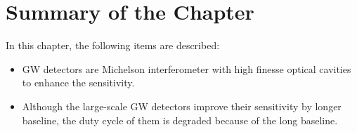 \section{Summary of the Chapter}
In this chapter, the following items are described:
\begin{itemize}
\item GW detectors are Michelson interferometer with high finesse optical cavities to enhance the sensitivity.
\item Although the large-scale GW detectors improve their sensitivity by longer baseline, the duty cycle of them is degraded because of the long baseline.
\end{itemize}
